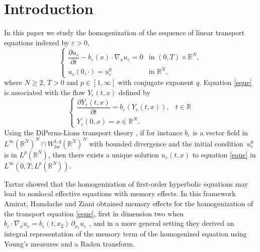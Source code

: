 \documentclass[11pt]{article}
\newcommand{\loc}{\mathrm{loc}}
\def \RR {\mathbb R}
\theoremstyle{plain}
\theoremstyle{definition}
\numberwithin{equation}{section}
\begin{document}
\section{Introduction}
In this paper we study the homogenization of the sequence of linear transport equations indexed by $\varepsilon>0$,
\begin{equation}\label{eque}
\begin{cases}
\dfrac{\partial u_\varepsilon}{\partial t}-b_\varepsilon(x)\cdot\nabla_x u_\varepsilon=0 & \mbox{in }(0,T)\times\RR^N,
\\[5pt]
u_\varepsilon(0,\cdot)=u_\varepsilon^0 & \mbox{in }\RR^N.
\end{cases}
\end{equation}
where $N\geq 2$, $T>0$ and $p\in[1,\infty]$ with conjugate exponent $q$.
Equation \eqref{eque} is associated with the flow $Y_\varepsilon(t,x)$ defined by
\begin{equation}\label{Yebei}
\begin{cases}
\dfrac{\partial Y_\varepsilon(t,x)}{\partial t}=b_\varepsilon(Y_\varepsilon(t,x)), & t\in\RR
\\[5pt]
Y_\varepsilon(0,x)=x\in\RR^N.
\end{cases}
\end{equation}
Using the DiPerna-Lions transport theory \cite[Cor.\,II.1]{DiLi}, if for instance $b_\varepsilon$ is a vector field in $L^\infty(\RR^N)^N\cap W^{1,q}_\loc(\RR^N)^N$ with bounded divergence and the initial condition~$u_\varepsilon^0$ is in $L^p(\RR^N)$, then there exists a unique solution $u_\varepsilon(t,x)$ to equation \eqref{eque} in $L^\infty(0,T;L^p(\RR^N))$.

Tartar \cite{Tar} showed that the homogenization of first-order hyperbolic equations may lead to nonlocal effective equations with memory effects.
In this framework Amirat, Hamdache and Ziani obtained memory effects for the homogenization of the transport equation \eqref{eque}, first in dimension two when $b_\varepsilon\cdot\nabla_x u_\varepsilon=b_\varepsilon(t,x_2)\,\partial_{x_1}u_\varepsilon$ \cite{AHZ1}, and in a more general setting \cite{AHZ2,AHZ3} they derived an integral representation of the memory term of the homogenized equation using Young's measures and a Radon transform.
\end{document}
